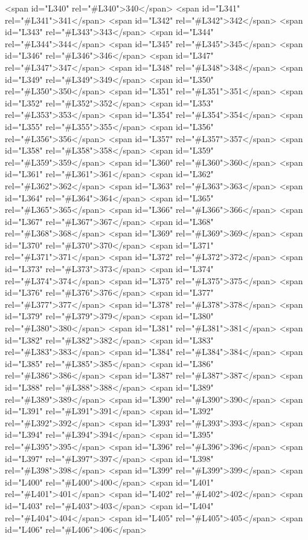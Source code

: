 <span id="L340" rel="#L340">340</span>
<span id="L341" rel="#L341">341</span>
<span id="L342" rel="#L342">342</span>
<span id="L343" rel="#L343">343</span>
<span id="L344" rel="#L344">344</span>
<span id="L345" rel="#L345">345</span>
<span id="L346" rel="#L346">346</span>
<span id="L347" rel="#L347">347</span>
<span id="L348" rel="#L348">348</span>
<span id="L349" rel="#L349">349</span>
<span id="L350" rel="#L350">350</span>
<span id="L351" rel="#L351">351</span>
<span id="L352" rel="#L352">352</span>
<span id="L353" rel="#L353">353</span>
<span id="L354" rel="#L354">354</span>
<span id="L355" rel="#L355">355</span>
<span id="L356" rel="#L356">356</span>
<span id="L357" rel="#L357">357</span>
<span id="L358" rel="#L358">358</span>
<span id="L359" rel="#L359">359</span>
<span id="L360" rel="#L360">360</span>
<span id="L361" rel="#L361">361</span>
<span id="L362" rel="#L362">362</span>
<span id="L363" rel="#L363">363</span>
<span id="L364" rel="#L364">364</span>
<span id="L365" rel="#L365">365</span>
<span id="L366" rel="#L366">366</span>
<span id="L367" rel="#L367">367</span>
<span id="L368" rel="#L368">368</span>
<span id="L369" rel="#L369">369</span>
<span id="L370" rel="#L370">370</span>
<span id="L371" rel="#L371">371</span>
<span id="L372" rel="#L372">372</span>
<span id="L373" rel="#L373">373</span>
<span id="L374" rel="#L374">374</span>
<span id="L375" rel="#L375">375</span>
<span id="L376" rel="#L376">376</span>
<span id="L377" rel="#L377">377</span>
<span id="L378" rel="#L378">378</span>
<span id="L379" rel="#L379">379</span>
<span id="L380" rel="#L380">380</span>
<span id="L381" rel="#L381">381</span>
<span id="L382" rel="#L382">382</span>
<span id="L383" rel="#L383">383</span>
<span id="L384" rel="#L384">384</span>
<span id="L385" rel="#L385">385</span>
<span id="L386" rel="#L386">386</span>
<span id="L387" rel="#L387">387</span>
<span id="L388" rel="#L388">388</span>
<span id="L389" rel="#L389">389</span>
<span id="L390" rel="#L390">390</span>
<span id="L391" rel="#L391">391</span>
<span id="L392" rel="#L392">392</span>
<span id="L393" rel="#L393">393</span>
<span id="L394" rel="#L394">394</span>
<span id="L395" rel="#L395">395</span>
<span id="L396" rel="#L396">396</span>
<span id="L397" rel="#L397">397</span>
<span id="L398" rel="#L398">398</span>
<span id="L399" rel="#L399">399</span>
<span id="L400" rel="#L400">400</span>
<span id="L401" rel="#L401">401</span>
<span id="L402" rel="#L402">402</span>
<span id="L403" rel="#L403">403</span>
<span id="L404" rel="#L404">404</span>
<span id="L405" rel="#L405">405</span>
<span id="L406" rel="#L406">406</span>
